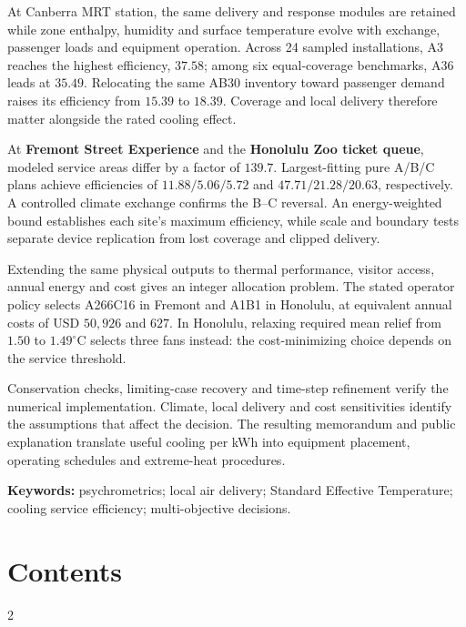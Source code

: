 \documentclass[12pt]{article}
\begin{document}
At Canberra MRT station, the same delivery and response modules are retained while zone enthalpy, humidity and surface temperature evolve with exchange, passenger loads and equipment operation. Across 24 sampled installations, A3 reaches the highest efficiency, $37.58$; among six equal-coverage benchmarks, A36 leads at $35.49$. Relocating the same AB30 inventory toward passenger demand raises its efficiency from $15.39$ to $18.39$. Coverage and local delivery therefore matter alongside the rated cooling effect.

At \textbf{Fremont Street Experience} and the \textbf{Honolulu Zoo ticket queue}, modeled service areas differ by a factor of $139.7$. Largest-fitting pure A/B/C plans achieve efficiencies of $11.88/5.06/5.72$ and $47.71/21.28/20.63$, respectively. A controlled climate exchange confirms the B--C reversal. An energy-weighted bound establishes each site's maximum efficiency, while scale and boundary tests separate device replication from lost coverage and clipped delivery.

Extending the same physical outputs to thermal performance, visitor access, annual energy and cost gives an integer allocation problem. The stated operator policy selects A266C16 in Fremont and A1B1 in Honolulu, at equivalent annual costs of USD $50{,}926$ and $627$. In Honolulu, relaxing required mean relief from $1.50$ to $1.49^\circ$C selects three fans instead: the cost-minimizing choice depends on the service threshold.

Conservation checks, limiting-case recovery and time-step refinement verify the numerical implementation. Climate, local delivery and cost sensitivities identify the assumptions that affect the decision. The resulting memorandum and public explanation translate useful cooling per kWh into equipment placement, operating schedules and extreme-heat procedures.

\noindent\textbf{Keywords:} psychrometrics; local air delivery; Standard Effective Temperature; cooling service efficiency; multi-objective decisions.

\newpage
\pagestyle{fancy}
\setcounter{tocdepth}{1}
\section*{Contents}
{\fontsize{10}{11.5}\selectfont
\setlength{\cftbeforesecskip}{1pt}
\begin{multicols}{2}
\makeatletter{}\makeatother
\end{multicols}}
\vspace{4pt}
\begingroup\small\endgroup


\end{document}
